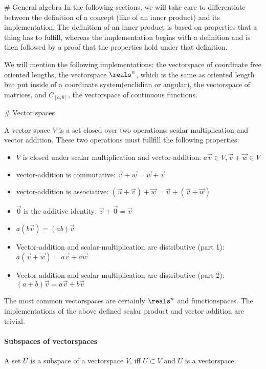 # General algebra
In the following sections, we will take care to differentiate between the definition of a concept (like of an inner product) and its implementation. The definition of an inner product is based on properties that a thing has to fulfill, whereas the implementation begins with a definition and is then followed by a proof that the properties hold under that definition.

We will mention the following implementations: the vectorspace of coordinate free oriented lengths, the vectorspace $\reals^n$, which is the same as oriented length but put inside of a coordinate system(euclidian or angular), the vectorspace of matrices, and $C_{[a,b]}$, the vectorspace of continuous functions.

# Vector spaces
 

\begin{definition} A vector space $V$ is a set closed over two operations: scalar multiplication and vector addition. These two operations must fullfill the following properties:
\begin{itemize}
    \item $V$ is closed under scalar multiplication and vector-addition: $a\vec{v} \in V, \vec{v} + \vec{w} \in V$
    \item vector-addition is commutative: $\vec{v} + \vec{w} = \vec{w} + \vec{v}$
    \item vector-addition is associative: $(\vec{u} + \vec{v}) + \vec{w} = \vec{u} + (\vec{v} + \vec{w})$
    \item $\vec{0}$ is the additive identity: $\vec{v} + \vec{0} = \vec{v}$
    
    \item $a(b\vec{v}) = (ab)\vec{v}$
    \item Vector-addition and scalar-multiplication are distributive (part 1): $a(\vec{v} + \vec{w}) = a\vec{v} + a\vec{w}$
    \item Vector-addition and scalar-multiplication are distributive (part 2): $(a+b)\vec{v} = a\vec{v} + b\vec{v}$
\end{itemize}
\end{definition}

The most common vectorspaces are certainly $\reals^n$ and functionspaces.
The implementations of the above defined scalar product and vector addition are trivial.







\paragraph{Subspaces of vectorspaces}
A set $U$ is a subspace of a vectorspace $V$, iff $U \subset V$ and $U$ is a vectorspace.








